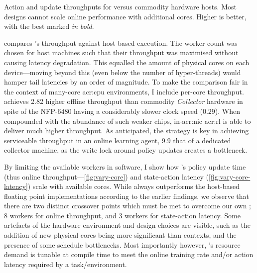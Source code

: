 \begin{table}
	\caption[Action and update throughputs for \approachshort{} versus commodity hardware hosts.]{Action and update throughputs for \approachshort{} versus commodity hardware hosts. Most designs cannot scale online performance with additional cores. Higher is better, with the best marked \emph{in bold}.\label{tab:tputs}}
\end{table}

 compares \approachshort{}'s throughput against host-based execution.
The worker count was chosen for host machines such that their throughput was maximised without causing latency degradation.
This equalled the amount of physical cores on each device---moving beyond this (even below the number of hyper-threads) would hamper tail latencies by an order of magnitude.
To make the comparison fair in the context of many-core \gls{acr:cpu} environments, I include per-core throughput.
\Indfw{} achieves \qty{2.82}{\times} higher offline throughput than commodity \emph{Collector} hardware in spite of the NFP-6480 having a considerably slower clock speed (\qty{0.29}{\times}).
When compounded with the abundance of such weaker chips, in-\gls{acr:nic} \gls{acr:rl} is able to deliver much higher throughput.
As anticipated, the \Coopfw{} strategy is key in achieving serviceable throughput in an online learning agent, \qty{9.9}{\times} that of a dedicated collector machine, as the write lock around policy updates creates a bottleneck.

By limiting the available workers in software, I show how \Coopfw{}'s policy update time (thus  online throughput---\cref{fig:vary-core}) and state-action latency (\cref{fig:vary-core-latency}) scale with available cores.
While \Coopfw{} always outperforms the host-based floating point implementations according to the earlier findings, we observe that there are two distinct crossover points which must be met to overcome our own \Indfw{}; \num{8} workers for online throughput, and \num{3} workers for state-action latency.
Some artefacts of the hardware environment and design choices are visible, such as the addition of new physical cores being more significant than contexts, and the presence of some schedule bottlenecks.
Most importantly however, \Coopfw{}'s resource demand is tunable at compile time to meet the online training rate and/or action latency required by a task/environment.

